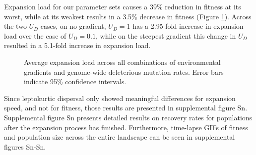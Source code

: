Expansion load for our parameter sets causes a 39\% reduction in fitness at its worst, while at its weakest results in a 3.5\% decrease in fitness (Figure \ref{fig:load}). %
Across the two $U_D$ cases, on no gradient, $U_D = 1$ has a 2.95-fold increase in expansion load over the case of $U_D = 0.1$, while on the steepest gradient this change in $U_D$ resulted in a 5.1-fold increase in expansion load.

\begin{figure}[h]
\centering
{}
\caption[~- Average expansion load.]{Average expansion load across all combinations of environmental gradients and genome-wide deleterious mutation rates. Error bars indicate 95\% confidence intervals.}
\label{fig:load}
\end{figure}


Since leptokurtic dispersal only showed meaningful differences for expansion speed, and not for fitness, those results are presented in supplemental figure \color{red}Sn\color{black}. Supplemental figure \color{red}Sn \color{black} presents detailed results on recovery rates for populations after the expansion process has finished. Furthermore, time-lapse GIFs of fitness and population size across the entire landscape can be seen in supplemental figures \color{red}Sn-Sn\color{black}.


